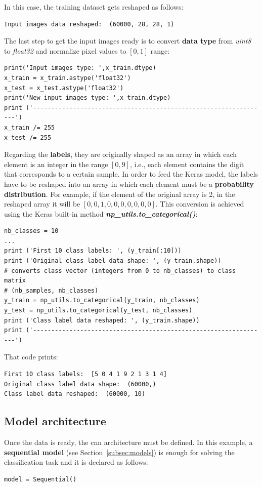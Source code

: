 In this case, the training dataset gets reshaped as follows:
\begin{Verbatim}[frame=single]
Input images data reshaped:  (60000, 28, 28, 1)
\end{Verbatim}

The last step to get the input images ready is to convert \textbf{data type} from \textit{uint8} to \textit{float32} and normalize pixel values to $[0,1]$ range:
\begin{lstlisting}
print('Input images type: ',x_train.dtype)
x_train = x_train.astype('float32')
x_test = x_test.astype('float32')
print('New input images type: ',x_train.dtype)
print ('-----------------------------------------------------------------')
x_train /= 255
x_test /= 255
\end{lstlisting}

Regarding the \textbf{labels}, they are originally shaped as an array in which each element is an integer in the range $[0, 9]$, i.e., each element contains the digit that corresponds to a certain sample. In order to feed the Keras model, the labels have to be reshaped into an array in which each element must be a \textbf{probability distribution}. For example, if the element of the original array is 2, in the reshaped array it will be $[0, 0, 1, 0, 0, 0, 0, 0, 0, 0]$. This conversion is achieved using the Keras built-in method \textbf{\textit{np\_utils.to\_categorical()}}:
\begin{lstlisting}
nb_classes = 10
...
print ('First 10 class labels: ', (y_train[:10]))
print ('Original class label data shape: ', (y_train.shape))
# converts class vector (integers from 0 to nb_classes) to class matrix
# (nb_samples, nb_classes)
y_train = np_utils.to_categorical(y_train, nb_classes)
y_test = np_utils.to_categorical(y_test, nb_classes)
print ('Class label data reshaped: ', (y_train.shape))
print ('-----------------------------------------------------------------')
\end{lstlisting}

That code prints:
\begin{Verbatim}[frame=single]
First 10 class labels:  [5 0 4 1 9 2 1 3 1 4]
Original class label data shape:  (60000,)
Class label data reshaped:  (60000, 10)
\end{Verbatim}

\subsection{Model architecture}
Once the data is ready, the \gls{cnn} architecture must be defined. In this example, a \textbf{sequential model} (see Section~\ref{subsec:models}) is enough for solving the classification task and it is declared as follows:
\begin{lstlisting}
model = Sequential()
\end{lstlisting}

